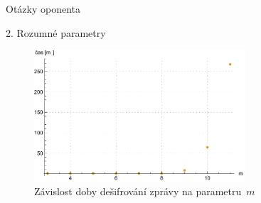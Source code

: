 \documentclass{beamer}
\begin{document}
%
%

\begin{frame}{Otázky oponenta}
    \begin{block}{2. Rozumné parametry}

        \begin{figure}
            \centering
            \includegraphics[width=0.7\textwidth]{../../implementace/grafy/listplot_mVelka_desifrovani.pdf}
            \caption[Časová složitost dešifrování]{
                Závislost doby dešifrování zprávy na parametru~$m$
            }
        \end{figure}

    \end{block}
\end{frame}

\end{document}
